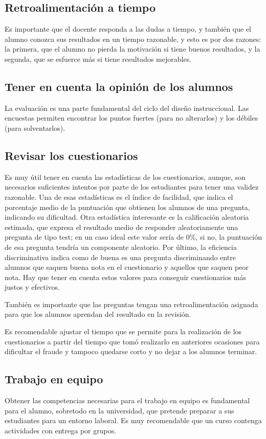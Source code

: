 \subsection{Retroalimentación a tiempo}
Es importante que el docente responda a las dudas a tiempo, y también que el alumno conozca sus resultados en un tiempo razonable, y esto es por dos razones: la primera, que el alumno no pierda la motivación si tiene buenos resultados, y la segunda, que se esfuerce más si tiene resultados mejorables.
\subsection{Tener en cuenta la opinión de los alumnos}
La evaluación es una parte fundamental del ciclo del diseño instruccional.
Las encuestas permiten encontrar los puntos fuertes (para no alterarlos) y los débiles (para solventarlos).

\subsection{Revisar los cuestionarios}
Es muy útil tener en cuenta las estadísticas de los cuestionarios, aunque, son necesarios suficientes intentos por parte de los estudiantes para tener una validez razonable. Una de esas estadísticas es el índice de facilidad, que indica el porcentaje medio de la puntuación que obtienen los alumnos de una pregunta, indicando su dificultad. Otra estadística interesante es la calificación aleatoria estimada, que expresa el resultado medio de responder aleatoriamente una pregunta de tipo test; en un caso ideal este valor sería de 0\%, si no, la puntuación de esa pregunta tendría un componente aleatorio. Por último, la eficiencia discriminativa\cite{discrimination-2021} indica como de buena es una pregunta discriminando entre alumnos que saquen buena nota en el cuestionario y aquellos que saquen peor nota. Hay que tener en cuenta estos valores para conseguir cuestionarios más justos y efectivos.

También es importante que las preguntas tengan una retroalimentación asignada para que los alumnos aprendan del resultado en la revisión.

Es recomendable ajustar el tiempo que se permite para la realización de los cuestionarios a partir del tiempo que tomó realizarlo en anteriores ocasiones para dificultar el fraude y tampoco quedarse corto y no dejar a los alumnos terminar.

\subsection{Trabajo en equipo}
Obtener las competencias necesarias para el trabajo en equipo es fundamental para el alumno, sobretodo en la universidad, que pretende preparar a sus estudiantes para un entorno laboral. Es muy recomendable que un curso contenga actividades con entrega por grupos.

